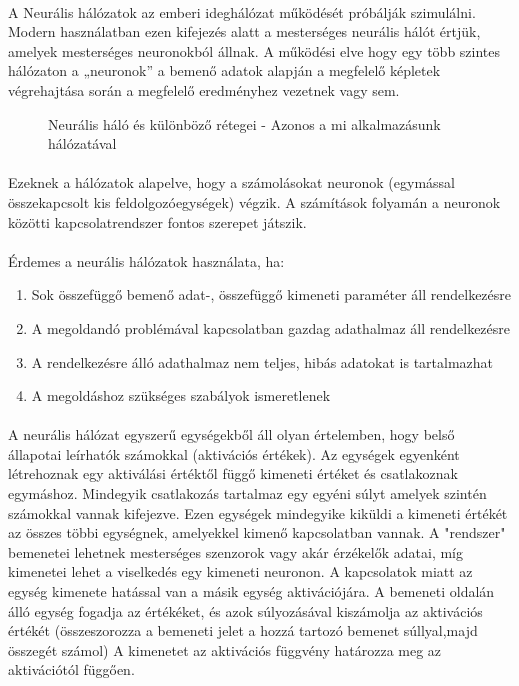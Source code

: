 \paragraph{}
A Neurális hálózatok az emberi ideghálózat működését próbálják szimulálni. Modern használatban ezen kifejezés alatt a mesterséges neurális hálót értjük, amelyek mesterséges neuronokból állnak. A működési elve hogy egy több szintes hálózaton a „neuronok” a bemenő adatok alapján a megfelelő képletek végrehajtása során a megfelelő eredményhez vezetnek vagy sem. 

\begin{figure}[t]
  \centering
  \caption[Egyszerű neurális háló]%
  {Neurális háló és különböző rétegei - Azonos a mi alkalmazásunk hálózatával}
  \label{fig:ALAP:sm1}
\end{figure}

\paragraph{} 
Ezeknek a hálózatok alapelve, hogy a számolásokat neuronok (egymással összekapcsolt kis feldolgozóegységek) végzik. A számítások folyamán a neuronok közötti kapcsolatrendszer fontos szerepet játszik.

\paragraph{}
Érdemes a neurális hálózatok használata, ha:
\begin{enumerate}
	\item Sok összefüggő bemenő adat-, összefüggő kimeneti paraméter áll rendelkezésre
	\item A megoldandó problémával kapcsolatban gazdag adathalmaz áll rendelkezésre
	\item A rendelkezésre álló adathalmaz nem teljes, hibás adatokat is tartalmazhat
	\item A megoldáshoz szükséges szabályok ismeretlenek 
\end{enumerate}

\paragraph{}
A neurális hálózat egyszerű egységekből áll olyan értelemben, hogy belső állapotai leírhatók számokkal (aktivációs értékek). Az egységek egyenként létrehoznak egy aktiválási értéktől függő kimeneti értéket és csatlakoznak egymáshoz. Mindegyik csatlakozás tartalmaz egy egyéni súlyt amelyek szintén számokkal vannak kifejezve. Ezen egységek mindegyike kiküldi a kimeneti értékét az összes többi egységnek, amelyekkel kimenő kapcsolatban vannak. A "rendszer" bemenetei lehetnek mesterséges szenzorok vagy akár érzékelők adatai, míg kimenetei lehet a viselkedés egy kimeneti neuronon. A kapcsolatok miatt az egység kimenete hatással van a másik egység aktivációjára. A bemeneti oldalán álló egység fogadja az értékéket, és azok súlyozásával kiszámolja az aktivációs értékét (összeszorozza a bemeneti jelet a hozzá tartozó bemenet súllyal,majd összegét számol) A kimenetet az aktivációs függvény határozza meg az aktivációtól függően.

